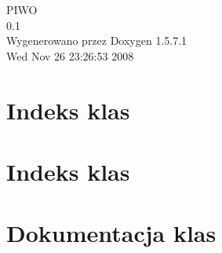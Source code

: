 \documentclass[a4paper]{book}
\begin{document}
\begin{titlepage}
\vspace*{7cm}
\begin{center}
{\Large PIWO \\[1ex]\large 0.1 }\\
\vspace*{1cm}
{\large Wygenerowano przez Doxygen 1.5.7.1}\\
\vspace*{0.5cm}
{\small Wed Nov 26 23:26:53 2008}\\
\end{center}
\end{titlepage}
\clearemptydoublepage
{}
\tableofcontents
\clearemptydoublepage
{}
\chapter{Indeks klas}

\chapter{Indeks klas}

\chapter{Dokumentacja klas}









\printindex
\end{document}
